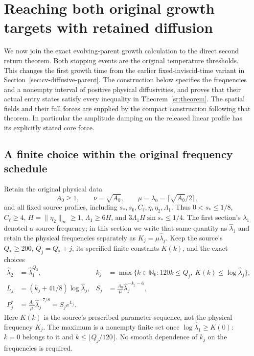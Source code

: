 \section{Reaching both original growth targets with retained diffusion}
\label{ave:section}

We now join the exact evolving-parent growth calculation to the direct
second return theorem. Both stopping events are the original temperature
thresholds. This changes the first growth time from the earlier
fixed-inviscid-time variant in Section~\ref{sec:cv-diffusive-parent}.
The construction below specifies the frequencies and a nonempty interval
of positive physical diffusivities, and proves that their actual entry
states satisfy every inequality in Theorem~\ref{sr:theorem}.
The spatial fields and their full forces are supplied by the compact
construction following that theorem. In particular the amplitude damping
on the released linear profile has its explicitly stated core force.

\subsection{A finite choice within the original frequency schedule}

Retain the original physical data
\[
 A_0\geq1,\qquad\nu=\sqrt{A_0},\qquad
 \mu=\lambda_0=\lceil\sqrt{A_0}/2\rceil,
\]
and all fixed source profiles, including
$s_*,s_0,C_\ell,\eta,\eta_2,\Lambda_1$.
Thus $0<s_*\leq1/8$, $C_\ell\geq4$, $H=\|\eta_2\|_\infty\geq1$,
$\Lambda_1\geq6H$, and $3\Lambda_1H\sin s_*\leq1/4$.
The first section's $\lambda_1$ denoted a source frequency; in this section
we write that same quantity as $\widehat\lambda_1$ and retain the
physical frequencies separately as $K_j=\mu\widehat\lambda_j$.
Keep the source's $Q_*\geq200$, $Q_j=Q_*+j$, its specified finite
constants $K(k)$, and the exact choices
\begin{align}
 \widehat\lambda_2&=\widehat\lambda_1^{Q_2},&
 k_j&=\max\{k\in\mathbb N_0:120k\leq Q_j,
                   \ K(k)\leq\log\widehat\lambda_j\},\nonumber\\
 L_j&=(k_j+41/8)\log\widehat\lambda_j,&
 S_j&=\frac{A_0}{\mu}\widehat\lambda_j^{-k_j-6},\nonumber\\
 P_j^*&=\frac{A_0}{\mu}\widehat\lambda_j^{-7/8}=S_je^{L_j}.
 \label{ave:source_choices}
\end{align}
Here $K(k)$ is the source's prescribed parameter sequence, not the
physical frequency $K_j$. The maximum is a nonempty finite set once
$\log\widehat\lambda_1\geq K(0)$: $k=0$ belongs to it and
$k\leq\lfloor Q_j/120\rfloor$. No smooth dependence of $k_j$ on the
frequencies is required.

